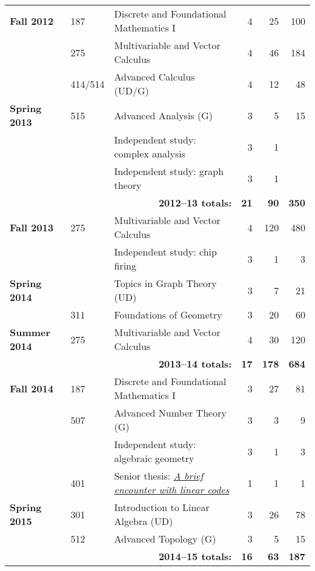 \documentclass[12pt]{article}
\begin{document}
\begin{center}
\begin{longtable}{@{} l l l rrr @{}}
\textbf{Fall 2012} & 187 & Discrete and Foundational Mathematics I & 4 & 25 & 100 \\
 & 275 & Multivariable and Vector Calculus & 4 & 46 & 184 \\
 & 414/514 & Advanced Calculus (UD/G) & 4 & 12 & 48 \\
\addlinespace[0.1in]

\textbf{Spring 2013} & 515 & Advanced Analysis (G) & 3 & 5 & 15 \\
 & & Independent study: complex analysis & 3 & 1 \\
 & & Independent study: graph theory & 3 & 1 \\
 \cmidrule{3-6}
 & & \multicolumn{1}{r}{\textbf{2012--13 totals:}} & \textbf{21} & \textbf{90} & \textbf{350} \\
 \cmidrule{3-6}

\textbf{Fall 2013} & 275 & Multivariable and Vector Calculus & 4 & 120 & 480 \\
 & & Independent study: chip firing & 3 & 1 & 3 \\
\addlinespace[0.1in]

\textbf{Spring 2014} & & Topics in Graph Theory (UD) & 3 & 7 & 21 \\
 & 311 & Foundations of Geometry & 3 & 20 & 60 \\
\addlinespace[0.1in]

\textbf{Summer 2014} & 275 & Multivariable and Vector Calculus & 4 & 30 & 120 \\
 \cmidrule{3-6}
 & & \multicolumn{1}{r}{\textbf{2013--14 totals:}} & \textbf{17} & \textbf{178} & \textbf{684} \\
 \cmidrule{3-6}

\textbf{Fall 2014} & 187 & Discrete and Foundational Mathematics I & 3 & 27 & 81 \\
 & 507 & Advanced Number Theory (G) & 3 & 3 & 9 \\
 & & Independent study: algebraic geometry & 3 & 1 & 3 \\
 & 401 & Senior thesis: \href{https://scholarworks.boisestate.edu/math_undergraduate_theses/3/}{\emph{A brief encounter with linear codes}} & 1 & 1 & 1 \\
\addlinespace[0.1in]

\textbf{Spring 2015} & 301 & Introduction to Linear Algebra (UD) & 3 & 26 & 78 \\
 & 512 & Advanced Topology (G) & 3 & 5 & 15 \\
 \cmidrule{3-6}
 & & \multicolumn{1}{r}{\textbf{2014--15 totals:}} & \textbf{16} & \textbf{63} & \textbf{187} \\
 \cmidrule{3-6}


\end{longtable}
\end{center}
\end{document}
